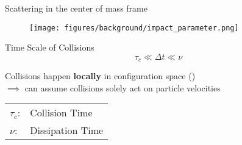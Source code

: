 \begin{frame}{Scattering in the center of mass frame}

    \begin{figure}
        \begin{center}
            \texttt{[image: figures/background/impact\_parameter.png]}
        \end{center}
        \label{fig:PICloopVel}
    \end{figure}

    \pause
    \begin{block}{Time Scale of Collisions}
        \begin{equation}
            \label{eq:timescales}
            \tau_c \ll \Delta t \ll \nu
        \end{equation}
    \end{block}

    \vspace{2mm}
    
    \item Collisions happen \textbf{locally} in configuration space (\cite{Callend2018Chapter3}) \\$\implies$ can assume collisions solely act on particle velocities

    \vspace{5mm}
    \begin{definitionBlock}
        \begin{tabular}{ll}
            $\tau_c$: & Collision Time \\
            $\nu$: & Dissipation Time
        \end{tabular}
    \end{definitionBlock}
\end{frame}

